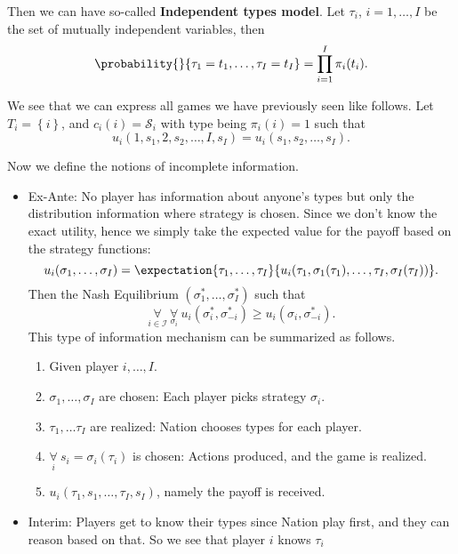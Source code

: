 \hr

Then we can have so-called \textbf{Independent types model}. Let \(\tau_{i}\), \(i = 1, \ldots , I\) be the set of mutually independent
variables, then
\[
	\probability{}{\tau_{1} = t_1, \ldots , \tau_{I} = t_{I}}=\prod\limits_{i = 1}^{I} \pi_{i}(t_{i}).
\]

\hr

We see that we can express all games we have previously seen like follows. Let \(T_{i} = \left\{i\right\}\), and
\(c_{i}(i) = \mathcal{S}_{i}\) with type being \(\pi_i(i) = 1\) such that
\[
	u_{i}(1, s_1, 2, s_2, \ldots , I, s_I) = u_{i}(s_1, s_2, \ldots , s_I).
\]

\hr

Now we define the notions of incomplete information.
\begin{itemize}
	\item Ex-Ante: No player has information about anyone's types but only the distribution information where strategy is chosen.
	      Since we don't know the exact utility, hence we simply take the expected value for the payoff based on the strategy functions:
	      \[
		      u_{i}(\sigma_1, \ldots , \sigma_I)=\expectation{\tau_1, \ldots , \tau_I}{u_{i}(\tau_1, \sigma_1(\tau_1), \ldots ,\tau_I, \sigma_I(\tau_I) )}.
	      \]
	      Then the Nash Equilibrium \((\sigma_1^{*}, \ldots , \sigma_{I}^{*})\) such that
	      \[
		      \underset{i\in\mathcal{I}}{\forall} \ \underset{\sigma_{i}}{\forall}\ u_{i}(\sigma_{i}^{*}, \sigma^{*}_{-i})\geq u_{i}(\sigma_{i}, \sigma^{*}_{-i}).
	      \]
	      This type of information mechanism can be summarized as follows.
	      \begin{enumerate}
		      \item Given player \(i, \ldots , I\).
		      \item \(\sigma_1, \ldots , \sigma_{I}\) are chosen: Each player picks strategy \(\sigma_{i}\).
		      \item \(\tau_1, \ldots \tau_{I}\) are realized: Nation chooses types for each player.
		      \item \(\underset{i}{\forall }\ s_{i} = \sigma_{i}(\tau_{i})\) is chosen: Actions produced, and the game is realized.
		      \item \(u_{i}(\tau_1, s_1, \ldots , \tau_{I}, s_{I})\), namely the payoff is received.
	      \end{enumerate}
	\item Interim: Players get to know their types since Nation play first, and they can reason based on that. So we see that player \(i\) knows \(\tau_{i}\)

\end{itemize}
